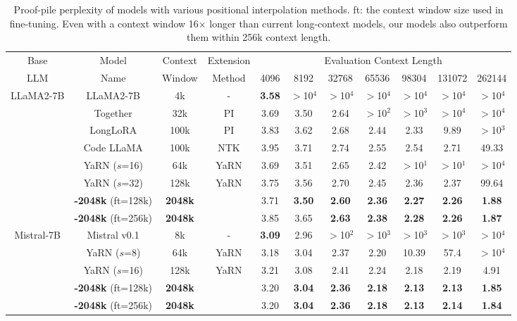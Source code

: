 \documentclass{article}
\theoremstyle{plain}
\theoremstyle{definition}
\theoremstyle{remark}
\begin{document}
\begin{table}[ht]
	\centering
	\fontsize{8}{8} \selectfont
	\caption{Proof-pile perplexity of models with various positional interpolation methods.  ft: the context window size used in fine-tuning. Even with a context window 16$\times$ longer than current long-context models, our models also outperform them within 256k context length.}
	\label{tbl:proof-pile}
	\begin{tabular}
		{ccccccccccc}
		\toprule
		Base& Model& Context &  Extension& \multicolumn{7}{c}{Evaluation Context Length}\\
		LLM		&Name&Window&Method&4096&8192&32768&65536&98304&131072&262144\\
		\hline
		\multirow{8}{*}{LLaMA2-7B}& LLaMA2-7B& 4k&- &\bf 3.58 &$>$10$^4$&$>$10$^4$&$>$10$^4$&$>$10$^4$&$>$10$^4$&$>$10$^4$\\
		& Together&32k&PI&3.69& 3.50&2.64&$>$10$^2$&$>$10$^3$&$>$10$^4$&$>$10$^4$\\
		&LongLoRA&100k&PI&3.83& 3.62 &2.68 & 2.44& 2.33& 9.89&$>$10$^3$\\
		&Code LLaMA& 100k& NTK &3.95&3.71&2.74&2.55&2.54&2.71&49.33\\
		&YaRN ($s$=16)&64k&YaRN&3.69& 3.51&2.65&2.42&$>$10$^1$&$>$10$^1$&$>$10$^4$\\
		&YaRN ($s$=32)&128k&YaRN&3.75&3.56&2.70&2.45&2.36&2.37&99.64\\
		&\textbf{{\sysname}-2048k} (ft=128k) &\bf 2048k&{\sysname} &3.71&\bf 3.50 & \bf 2.60& \bf 2.36&\bf2.27  &\bf 2.26 &\bf 1.88\\
		&\textbf{{\sysname}-2048k} (ft=256k) &\bf 2048k&{\sysname} &3.85&3.65 &\bf 2.63 & \bf 2.38& \bf 2.28& \bf 2.26&\bf 1.87\\
		\hline
		\multirow{5}{*}{Mistral-7B}&{Mistral v0.1}&8k&-&\bf 3.09&2.96&$>$10$^2$&$>$10$^3$&$>$10$^3$ & $>$10$^3$&$>$10$^4$\\
		&YaRN ($s$=8) &64k& YaRN&3.18& 3.04&2.37 & 2.20& 10.39&57.4&$>$10$^4$\\
		&YaRN ($s$=16) & 128k & YaRN &3.21& 3.08&2.41 & 2.24&2.18 & 2.19 &4.91\\
		&\textbf{{\sysname}-2048k} (ft=128k)&\bf2048k&{\sysname} &3.20&\bf 3.04&\bf 2.36 &\bf 2.18 &\bf 2.13 &\bf 2.13 &\bf 1.85\\
		&\textbf{{\sysname}-2048k} (ft=256k)  &\bf2048k&{\sysname} &3.20&\bf 3.04 &\bf 2.36 &\bf 2.18 &\bf 2.13 &\bf 2.14 &\bf 1.84\\
		\hline
	\end{tabular}
\end{table}
\end{document}
